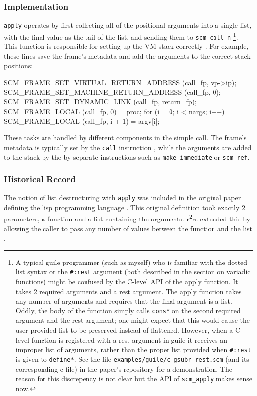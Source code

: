 \subsubsection{Implementation}
\texttt{apply} operates by first collecting all of the positional arguments into a single
list, with the final value as the tail of the list, and sending them to
\texttt{scm\_call\_n}
\parencite[][libguile/eval.c lines 585-622, lines 715-729]{guile-source}
\footnote{
  A typical guile programmer (such as myself) who is familiar with the dotted list syntax
  or the \texttt{\#:rest} argument (both described in the section on variadic functions)
  might be confused by the C-level API of the apply function.
  It takes 2 required arguments and a rest argument.
  The apply function takes any number of arguments and requires that the final argument is
  a list.
  Oddly, the body of the function simply calls \texttt{cons*} on the second required
  argument and the rest argument; one might expect that this would cause the user-provided
  list to be preserved instead of flattened.
  However, when a C-level function is registered with a rest argument in guile it receives
  an improper list of arguments, rather than the proper list provided when
  \texttt{\#:rest} is given to \texttt{define*}.
  See the file \texttt{examples/guile/c-gsubr-rest.scm} (and its corresponding c file) in
  the paper's repository for a demonstration.
  The reason for this discrepency is not clear but the API of \texttt{scm\_apply} makes
  sense now.
}.
This function is responsible for setting up the VM stack correctly
\parencite[][libguile/vm.c lines 1542-1621]{guile-source}.
For example, these lines save the frame's metadata and add the arguments to the correct
stack positions:

\begin{pygmented}[lang=c]
SCM_FRAME_SET_VIRTUAL_RETURN_ADDRESS (call_fp, vp->ip);
SCM_FRAME_SET_MACHINE_RETURN_ADDRESS (call_fp, 0);
SCM_FRAME_SET_DYNAMIC_LINK (call_fp, return_fp);
SCM_FRAME_LOCAL (call_fp, 0) = proc;
for (i = 0; i < nargs; i++)
  SCM_FRAME_LOCAL (call_fp, i + 1) = argv[i];
\end{pygmented}

These tasks are handled by different components in the simple call.
The frame's metadata is typically set by the \texttt{call} instruction , while the
arguments are added to the stack by the by separate instructions such as
\texttt{make-immediate} or \texttt{scm-ref}.

\subsubsection{Historical Record}
The notion of list destructuring with \texttt{apply} was included in the original paper
defining the lisp programming language
\parencite[][pages 189-190]{original-lisp-paper-pt-1}.
This original definition took exactly 2 parameters, a function and a list containing the
arguments.
r\textsuperscript{2}rs extended this by allowing the caller to pass any number of values
between the function and the list
\parencite[][page 57]{r2rs}.

